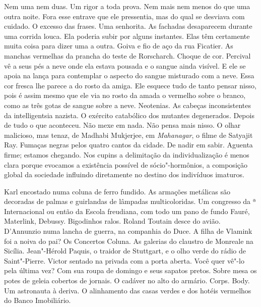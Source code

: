 Nem uma nem duas. Um rigor a toda prova. Nem mais nem menos do que uma
outra noite. Fora esse entrave que ele pressentia, mas do qual se
desviava com cuidado. O excesso das frases. Uma senhorita. As fachadas
desaparecem durante uma corrida louca. Ela poderia subir por alguns
instantes. Elas têm certamente muita coisa para dizer uma a outra. Goiva
e fio de aço da rua Ficatier. As manchas vermelhas da prancha  do
teste de Rorscharch. Choque de cor. Percival vê a seus pés a neve onde
ela estava pousada e o sangue ainda visível. E ele se apoia na lança
para contemplar o aspecto do sangue misturado com a neve. Essa cor
fresca lhe parece a do rosto da amiga. Ele esquece tudo de tanto pensar
nisso, pois é assim mesmo que ele via no rosto da amada o vermelho sobre
o branco, como as três gotas de sangue sobre a neve. Neotenias. As
cabeças inconsistentes da intelligentsia nazista. O exército catabólico
dos mutantes degenerados. Depois de tudo o que aconteceu. Não mexe em
nada. Não pensa mais nisso. O olhar malicioso, mas tenaz, de Madhabi
Mukjerjee, em \emph{Mahanagar}, o filme de Satyajit Ray. Fumaças negras
pelos quatro cantos da cidade. De nadir em sabir. Aguenta firme; estamos
chegando. Nos cupins a delimitação da individualização é menos clara
porque evocamos a existência possível de sócio"-hormônios, a composição
global da sociedade influindo diretamente no destino dos indivíduos
imaturos.

Karl encostado numa coluna de ferro fundido. As armações metálicas são
decoradas de palmas e guirlandas de lâmpadas multicoloridas. Um
congresso da ª Internacional ou então da Escola freudiana, com todo um
pano de fundo Fauré, Materlink, Debussy. Bigodinhos ralos. Roland %
Toutain desce do avião. D'Annunzio numa lancha de guerra, na companhia
do Duce. A filha de Vlamink foi a noiva do pai? Os Concertos Coluna. As
galerias do claustro de Monreale na Sicília. Jean"-Hérold Paquis, o
traidor de Stuttgart, e o olho verde do rádio de Saint"-Pierre. Victor
sentado na privada com a porta aberta. Você quer vê"-lo pela última vez?
Com sua roupa de domingo e seus sapatos pretos. Sobre mesa os potes de
geleia cobertos de jornais. O cadáver no alto do armário. Corps. Body. %
Um astronauta à deriva. O alinhamento das casas verdes e dos hotéis
vermelhos do Banco Imobiliário.

